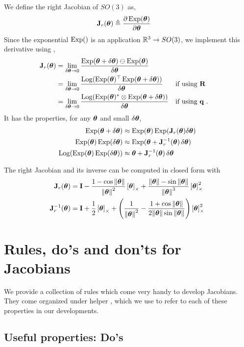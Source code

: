 We define the right Jacobian of $SO(3)$ as, 
%
\begin{align}
\bfJ_r(\bth) &\te \dpar{\Exp(\bth)}{\bth} 
\end{align}
%
Since the exponential $\Exp()$ is an application $\bbR^3\to SO(3)$,
we implement this derivative using ,
%
\begin{align}
\bfJ_r(\bth) &= \lim_{\dth\to0}\frac{\Exp(\bth+\dth)\ominus\Exp(\bth)}{\dth} \\
 &= \lim_{\dth\to0}\frac{\Log(\Exp(\bth)\tr\Exp(\bth+\dth))}{\dth} && \textrm{if using $\bfR$} \\
 &= \lim_{\dth\to0}\frac{\Log(\Exp(\bth)^*\ot\Exp(\bth+\dth))}{\dth} && \textrm{if using $\bfq$} 
 ~.
\end{align}
%
It has the properties, for any $\bth$ and small $\dth$,
%
\begin{align}
\Exp(\bth+\dth) &\approx \Exp(\bth)\Exp(\bfJ_r(\bth)\dth) \\
\Exp(\bth)\Exp(\dth) &\approx \Exp(\bth+\bfJ_r\inv(\bth)\,\dth) \\
\Log(\Exp(\bth)\Exp(\dth)) &\approx \bth+\bfJ_r\inv(\bth)\,\dth 
\end{align}

The right Jacobian and its inverse can be computed in closed form with
%
\begin{align}
\bfJ_r(\bth) &= \bfI - \frac{1-\cos\nth}{\nth^2}\hatx{\bth} + \frac{\nth-\sin\nth}{\nth^3}\hatx{\bth}^2 \\
\bfJ_r\inv(\bth) &= \bfI + \frac12\hatx{\bth} + \left(\frac1{\nth^2} - \frac{1+\cos\nth}{2\nth\sin\nth}\right)\hatx{\bth}^2
\end{align}






\newpage
\section{Rules, do's and don'ts for Jacobians}
\label{sec:DosDonts}

We provide a collection of rules which come very handy to develop Jacobians. They come organized under helper \!\!\!\!, which we use to refer to each of these properties in our developments.

\subsection{Useful properties: Do's}

